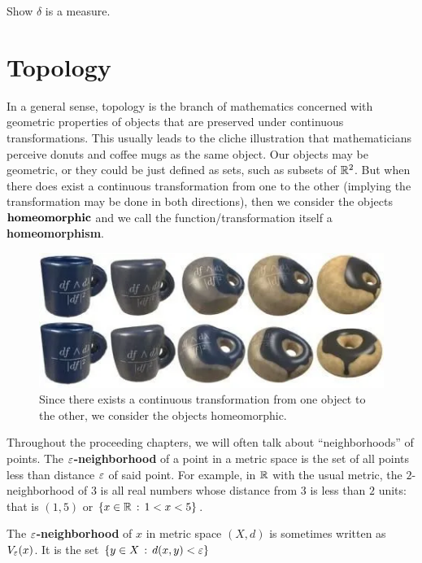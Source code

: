 \begin{exercise}
    Show $\delta$ is a measure. 
\end{exercise}


\section{Topology}

In a general sense, topology is the branch of mathematics concerned with geometric properties of objects that are preserved under continuous transformations. This usually leads to the cliche illustration that mathematicians perceive donuts and coffee mugs as the same object. Our objects may be geometric, or they could be just defined as sets, such as subsets of $\mathbb{R}^2$. But when there does exist a continuous transformation from one to the other (implying the transformation may be done in both directions), then we consider the objects $\textbf{homeomorphic}\index{Homeomorphic}$ and we call the function/transformation itself a \textbf{homeomorphism}.\par

\begin{figure}[h]
    \centering
    \includegraphics[width=0.5\linewidth]{Images/Chap0/0.4.1.png}
    \caption{Since there exists a continuous transformation from one object to the other, we consider the objects homeomorphic.}
    \label{fig:donut-coffee}
\end{figure}

Throughout the proceeding chapters, we will often talk about ``neighborhoods'' of points. The \textbf{$\e$-neighborhood} of a point in a metric space is the set of all points less than distance $\e$ of said point. For example, in $\mathbb{R}$ with the usual metric, the $2$-neighborhood of $3$ is all real numbers whose distance from $3$ is less than $2$ units: that is $(1,5)$ or $\{x\in\mathbb{R}\, :\, 1<x<5\}$. \par

\begin{definition}[$\e$-neighborhood]
    The \textbf{$\e$-neighborhood} of $x$ in metric space $(X,d)$ is sometimes written as $V_\varepsilon(x)$. It is the set $\{y\in X \, :\, d(x,y)<\varepsilon\}$
\end{definition}

